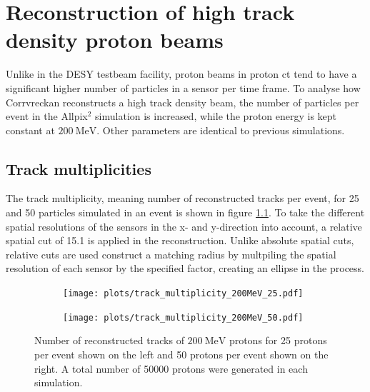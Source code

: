 \chapter{Reconstruction of high track density proton beams}\label{sec:density}
Unlike in the DESY testbeam facility, proton beams in proton ct tend to have a significant higher number of particles in a sensor
per time frame. To analyse how Corrvreckan reconstructs a high track density beam, the number of particles per event in the Allpix$^2$
simulation is increased, while the proton energy is kept constant at $\SI{200}{\mega\eV}$. Other parameters are identical to previous simulations.

\section{Track multiplicities}
The track multiplicity, meaning number of reconstructed tracks per event, for 25 and 50 particles simulated in an event is shown in figure \ref{fig:multiplicity}. To take the different spatial resolutions of the sensors in the x- and y-direction into account, a relative
spatial cut of 15.1 is applied in the reconstruction. Unlike absolute spatial cuts, relative cuts are used construct a
matching radius by multpiling the spatial resolution
of each sensor by the specified factor, creating an ellipse in the process.

\begin{figure}
  \hspace{-2.5cm}
  \begin{subfigure}{0.62\textwidth}
      \centering
      \texttt{[image: plots/track\_multiplicity\_200MeV\_25.pdf]}
  \end{subfigure}
  \begin{subfigure}{0.62\textwidth}
      \hspace{0.95cm}
      \texttt{[image: plots/track\_multiplicity\_200MeV\_50.pdf]}
  \end{subfigure}
  \caption{Number of reconstructed tracks of $\SI{200}{\mega\eV}$ protons for 25 protons per event shown on the left and
  50 protons per event shown on the right. A total number of 50000 protons were generated in each simulation. }
  \label{fig:multiplicity}
\end{figure}

